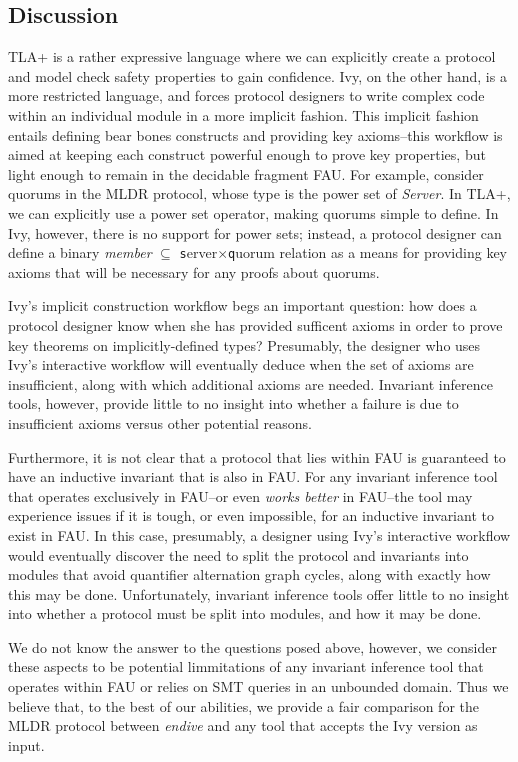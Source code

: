 \documentclass[runningheads]{llncs}
\newcommand{\ivy}[1]{{\texttt #1}}
\begin{document}
\subsection{Discussion}

TLA+ is a rather expressive language where we can explicitly create a protocol and model check safety properties to gain confidence.  Ivy, on the other hand, is a more restricted language, and forces protocol designers to write complex code within an individual module in a more implicit fashion.  This implicit fashion entails defining bear bones constructs and providing key axioms--this workflow is aimed at keeping each construct powerful enough to prove key properties, but light enough to remain in the decidable fragment FAU.  For example, consider quorums in the MLDR protocol, whose type is the power set of \textit{Server}.  In TLA+, we can explicitly use a power set operator, making quorums simple to define.  In Ivy, however, there is no support for power sets; instead, a protocol designer can define a binary \textit{member} ${\scriptstyle\subseteq}$ \ivy{server}$\times$\ivy{quorum} relation as a means for providing key axioms that will be necessary for any proofs about quorums.

Ivy's implicit construction workflow begs an important question: how does a protocol designer know when she has provided sufficent axioms in order to prove key theorems on implicitly-defined types?  Presumably, the designer who uses Ivy's interactive workflow will eventually deduce when the set of axioms are insufficient, along with which additional axioms are needed.  Invariant inference tools, however,  provide little to no insight into whether a failure is due to insufficient axioms versus other potential reasons.

Furthermore, it is not clear that a protocol that lies within FAU is guaranteed to have an inductive invariant that is also in FAU.  For any invariant inference tool that operates exclusively in FAU--or even \textit{works better} in FAU--the tool may experience issues if it is tough, or even impossible, for an inductive invariant to exist in FAU.  In this case, presumably, a designer using Ivy's interactive workflow would eventually discover the need to split the protocol and invariants into modules that avoid quantifier alternation graph cycles, along with exactly how this may be done.  Unfortunately, invariant inference tools offer little to no insight into whether a protocol must be split into modules, and how it may be done.

We do not know the answer to the questions posed above, however, we consider these aspects to be potential limmitations of any invariant inference tool that operates within FAU or relies on SMT queries in an unbounded domain.  Thus we believe that, to the best of our abilities, we provide a fair comparison for the MLDR protocol between \textit{endive} and any tool that accepts the Ivy version as input.





\end{document}
